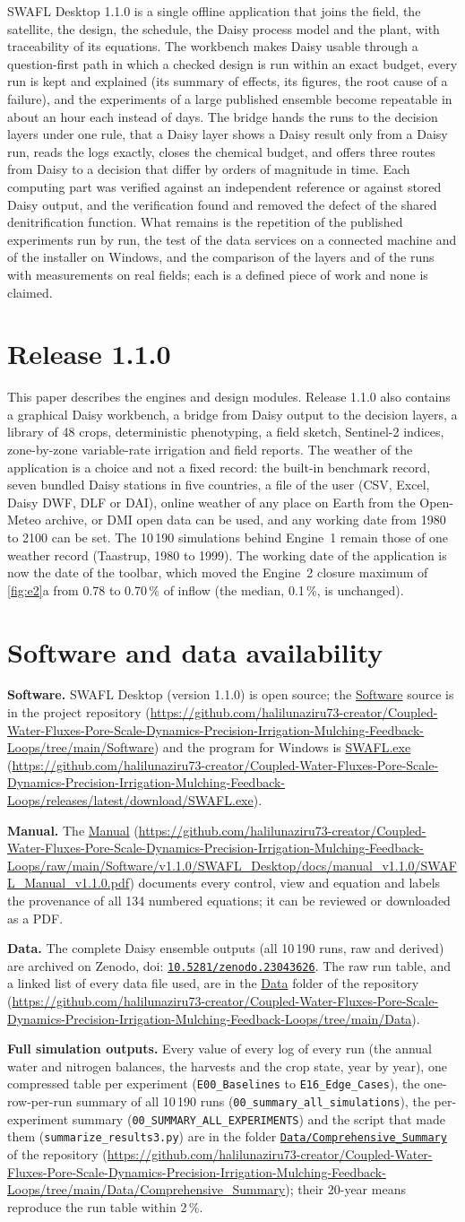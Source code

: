 \documentclass[preprint,12pt]{elsarticle}
\newcommand{\doihl}[1]{doi: \href{https://doi.org/#1}{\nolinkurl{#1}}}
\newcommand{\repourl}{https://github.com/halilunaziru73-creator/Coupled-Water-Fluxes-Pore-Scale-Dynamics-Precision-Irrigation-Mulching-Feedback-Loops}
\newcommand{\dataurl}{\repourl/tree/main/Data}
\newcommand{\softurl}{\repourl/tree/main/Software}
\newcommand{\datalink}{\href{\dataurl}{Data}}
\newcommand{\softlink}{\href{\softurl}{Software}}
\newcommand{\manuallink}{\href{\manualurl}{Manual}}
\newcommand{\downloadlink}{\href{\exeurl}{SWAFL.exe}}
\newcommand{\manualurl}{https://github.com/halilunaziru73-creator/Coupled-Water-Fluxes-Pore-Scale-Dynamics-Precision-Irrigation-Mulching-Feedback-Loops/raw/main/Software/v1.1.0/SWAFL_Desktop/docs/manual_v1.1.0/SWAFL_Manual_v1.1.0.pdf}
\newcommand{\exeurl}{https://github.com/halilunaziru73-creator/Coupled-Water-Fluxes-Pore-Scale-Dynamics-Precision-Irrigation-Mulching-Feedback-Loops/releases/latest/download/SWAFL.exe}
\newcommand{\csurl}{https://github.com/halilunaziru73-creator/Coupled-Water-Fluxes-Pore-Scale-Dynamics-Precision-Irrigation-Mulching-Feedback-Loops/tree/main/Data/Comprehensive_Summary}
\newcommand{\cslink}{\href{\csurl}{\nolinkurl{Data/Comprehensive_Summary}}}
\newcommand{\csavail}{\par\smallskip\textbf{Full simulation outputs.} Every value of every log of every run (the annual water and nitrogen balances, the harvests and the crop state, year by year), one compressed table per experiment (\texttt{E00\_Baselines} to \texttt{E16\_Edge\_Cases}), the one-row-per-run summary of all 10\,190 runs (\texttt{00\_summary\_all\_simulations}), the per-experiment summary (\texttt{00\_SUMMARY\_ALL\_EXPERIMENTS}) and the script that made them (\texttt{summarize\_results3.py}) are in the folder \cslink{} of the repository (\url{\csurl}); their 20-year means reproduce the run table within 2\,\%.}
\newcommand{\softavail}{%
\textbf{Software.} SWAFL Desktop (version 1.1.0) is open source; the \softlink{} source is in the project repository (\url{\softurl}) and the program for Windows is \downloadlink{} (\url{\exeurl}).
\par\smallskip\textbf{Manual.} The \manuallink{} (\url{\manualurl}) documents every control, view and equation and labels the provenance of all 134 numbered equations; it can be reviewed or downloaded as a PDF.
\par\smallskip\textbf{Data.} The complete Daisy ensemble outputs (all 10\,190 runs, raw and derived) are archived on Zenodo, \doihl{10.5281/zenodo.23043626}. The raw run table, and a linked list of every data file used, are in the \datalink{} folder of the repository (\url{\dataurl}).\csavail
}
\begin{document}
SWAFL Desktop 1.1.0 is a single offline application that joins the field, the satellite, the design, the schedule, the Daisy process model and the plant, with traceability of its equations. The workbench makes Daisy usable through a question-first path in which a checked design is run within an exact budget, every run is kept and explained (its summary of effects, its figures, the root cause of a failure), and the experiments of a large published ensemble become repeatable in about an hour each instead of days. The bridge hands the runs to the decision layers under one rule, that a Daisy layer shows a Daisy result only from a Daisy run, reads the logs exactly, closes the chemical budget, and offers three routes from Daisy to a decision that differ by orders of magnitude in time. Each computing part was verified against an independent reference or against stored Daisy output, and the verification found and removed the defect of the shared denitrification function. What remains is the repetition of the published experiments run by run, the test of the data services on a connected machine and of the installer on Windows, and the comparison of the layers and of the runs with measurements on real fields; each is a defined piece of work and none is claimed.

\section*{Release 1.1.0}
This paper describes the engines and design modules. Release 1.1.0 also contains a graphical Daisy workbench, a bridge from Daisy output to the decision layers, a library of 48 crops, deterministic phenotyping, a field sketch, Sentinel-2 indices, zone-by-zone variable-rate irrigation and field reports. The weather of the application is a choice and not a fixed record: the built-in benchmark record, seven bundled Daisy stations in five countries, a file of the user (CSV, Excel, Daisy DWF, DLF or DAI), online weather of any place on Earth from the Open-Meteo archive, or DMI open data can be used, and any working date from 1980 to 2100 can be set. The 10\,190 simulations behind Engine~1 remain those of one weather record (Taastrup, 1980 to 1999). The working date of the application is now the date of the toolbar, which moved the Engine~2 closure maximum of \cref{fig:e2}a from 0.78 to 0.70\,\% of inflow (the median, 0.1\,\%, is unchanged).

\section*{Software and data availability}
\softavail
\end{document}
